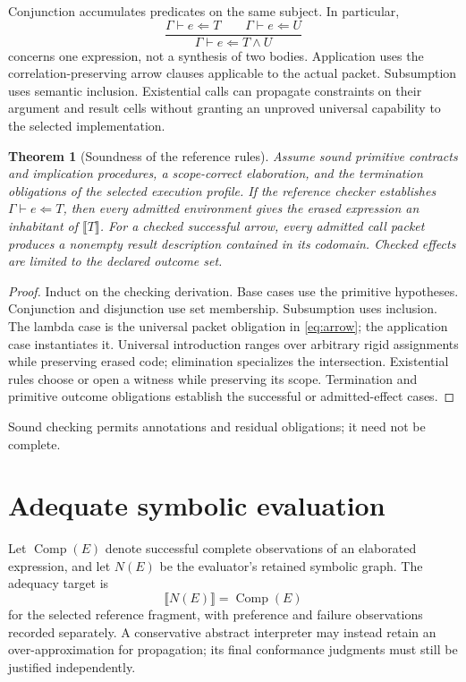 \documentclass[11pt,a4paper,oneside]{report}
\newcommand{\sem}[1]{\llbracket #1\rrbracket}
\newtheorem{theorem}[definition]{Theorem}
\theoremstyle{remark}
\begin{document}
Conjunction accumulates predicates on the same subject. In particular,
\[
 \frac{\Gamma\vdash e\Leftarrow T\qquad\Gamma\vdash e\Leftarrow U}
      {\Gamma\vdash e\Leftarrow T\land U}
\]
concerns one expression, not a synthesis of two bodies. Application uses the
correlation-preserving arrow clauses applicable to the actual packet.
Subsumption uses semantic inclusion. Existential calls can propagate constraints
on their argument and result cells without granting an unproved universal
capability to the selected implementation.

\begin{theorem}[Soundness of the reference rules]\label{thm:soundness}
Assume sound primitive contracts and implication procedures, a scope-correct
elaboration, and the termination obligations of the selected execution profile.
If the reference checker establishes $\Gamma\vdash e\Leftarrow T$, then every
admitted environment gives the erased expression an inhabitant of $\sem T$.
For a checked successful arrow, every admitted call packet produces a nonempty
result description contained in its codomain. Checked effects are limited to
the declared outcome set.
\end{theorem}
\begin{proof}
Induct on the checking derivation. Base cases use the primitive hypotheses.
Conjunction and disjunction use set membership. Subsumption uses inclusion.
The lambda case is the universal packet obligation in \cref{eq:arrow}; the
application case instantiates it. Universal introduction ranges over arbitrary
rigid assignments while preserving erased code; elimination specializes the
intersection. Existential rules choose or open a witness while preserving its
scope. Termination and primitive outcome obligations establish the successful
or admitted-effect cases.
\end{proof}
Sound checking permits annotations and residual obligations; it need not be
complete.

\section{Adequate symbolic evaluation}
Let $\operatorname{Comp}(E)$ denote successful complete observations of an
elaborated expression, and let $N(E)$ be the evaluator's retained symbolic graph.
The adequacy target is
\[
 \sem{N(E)}=\operatorname{Comp}(E)
\]
for the selected reference fragment, with preference and failure observations
recorded separately. A conservative abstract interpreter may instead retain an
over-approximation for propagation; its final conformance judgments must still
be justified independently.
\end{document}
